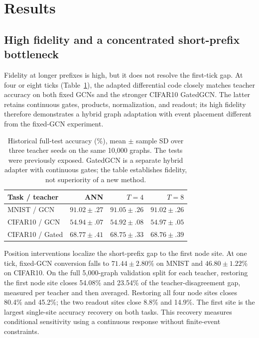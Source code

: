 \documentclass[10pt,twocolumn,letterpaper]{article}
\begin{document}
\section{Results}
\subsection{High fidelity and a concentrated short-prefix bottleneck}
Fidelity at longer prefixes is high, but it does not resolve the first-tick gap. At four or eight ticks (Table~\ref{tab:main}), the adapted differential code closely matches teacher accuracy on both fixed GCNs and the stronger CIFAR10 GatedGCN. The latter retains continuous gates, products, normalization, and readout; its high fidelity therefore demonstrates a hybrid graph adaptation with event placement different from the fixed-GCN experiment.

\begin{table}[t]
\caption{Historical full-test accuracy (\%), mean $\pm$ sample SD over three teacher seeds on the same 10,000 graphs. The tests were previously exposed. GatedGCN is a separate hybrid adapter with continuous gates; the table establishes fidelity, not superiority of a new method.}
\label{tab:main}
\centering\small
\setlength{\tabcolsep}{3.5pt}
\begin{tabular}{lrrr}\toprule
Task / teacher & ANN & $T=4$ & $T=8$\\\midrule
MNIST / GCN & $91.02\pm.27$ & $91.05\pm.26$ & $91.02\pm.26$\\
CIFAR10 / GCN & $54.94\pm.07$ & $54.92\pm.08$ & $54.97\pm.05$\\
CIFAR10 / Gated & $68.77\pm.41$ & $68.75\pm.33$ & $68.76\pm.39$\\\bottomrule
\end{tabular}
\end{table}

Position interventions localize the short-prefix gap to the first node site. At one tick, fixed-GCN conversion falls to $71.44\pm2.80\%$ on MNIST and $46.80\pm1.22\%$ on CIFAR10. On the full 5,000-graph validation split for each teacher, restoring the first node site closes 54.08\% and 23.54\% of the teacher-disagreement gap, measured per teacher and then averaged. Restoring all four node sites closes 80.4\% and 45.2\%; the two readout sites close 8.8\% and 14.9\%. The first site is the largest single-site accuracy recovery on both tasks. This recovery measures conditional sensitivity using a continuous response without finite-event constraints.
\end{document}
